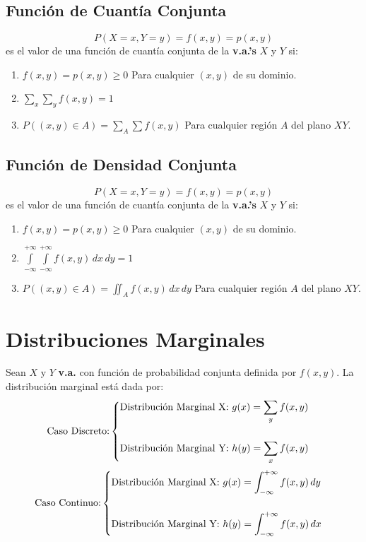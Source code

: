 \subsection{Función de Cuantía Conjunta}
$$P(X=x,Y=y)=f(x,y)=p(x,y)$$
es el valor de una función de cuantía conjunta de la \textbf{v.a.'s} $X$ y $Y$ si:
\begin{enumerate}[label=(\roman*)]
\item $f(x,y)=p(x,y)\geq 0$ \hspace{2cm} Para cualquier $(x,y)$ de su dominio.
\item $\displaystyle\sum_{x}\displaystyle\sum_{y} f(x,y)=1$
\item $P((x,y)\in A)=\displaystyle\sum _A\displaystyle\sum f(x,y)$ \hspace{2cm} Para cualquier región $A$ del plano $XY$.
\end{enumerate}
\subsection{Función de Densidad Conjunta}
$$P(X=x,Y=y)=f(x,y)=p(x,y)$$
es el valor de una función de cuantía conjunta de la \textbf{v.a.'s} $X$ y $Y$ si:
\begin{enumerate}[label=(\roman*)]
\item $f(x,y)=p(x,y)\geq 0$ \hspace{2cm} Para cualquier $(x,y)$ de su dominio.
\item $\int\limits_{-\infty}^{+\infty} \int\limits_{-\infty}^{+\infty} f(x,y) \,dx \,dy=1$
\item $P((x,y)\in A)=\iint_A f(x,y) \,dx \,dy$ \hspace{2cm} Para cualquier región $A$ del plano $XY$.
\end{enumerate}
\section{Distribuciones Marginales}
Sean $X$ y $Y$ \textbf{v.a.} con función de probabilidad conjunta definida por $f(x,y)$. La distribución marginal está dada por:
$$
\text{Caso Discreto:}
\begin{cases}
\text{Distribución Marginal X: } g(x)=\displaystyle\sum_{y}f(x,y)  \\ \vspace{0.1cm} \\
\text{Distribución Marginal Y: } h(y)=\displaystyle\sum_{x}f(x,y)
\end{cases}
$$
$$
\text{Caso Continuo:}
\begin{cases}
\text{Distribución Marginal X: } g(x)=\displaystyle\int_{-\infty}^{+\infty} f(x,y) \,dy \\ \vspace{0.1cm} \\
\text{Distribución Marginal Y: } h(y)=\displaystyle\int_{-\infty}^{+\infty} f(x,y) \,dx
\end{cases}
$$
